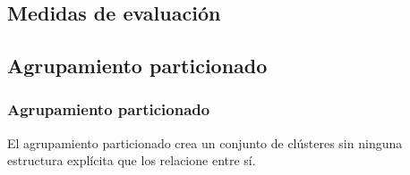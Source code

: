 \documentclass[t,compress,10pt,xcolor=dvipsnames]{beamer}
\begin{document}
	\subsection{Medidas de evaluaci\'on}

	\subsection{Agrupamiento particionado}
	\frame
	{
		\frametitle{Agrupamiento particionado}
		\vspace{7em}
		El agrupamiento particionado crea un conjunto  de clústeres sin ninguna estructura explícita que los relacione entre sí. 
	}
	
\end{document}
